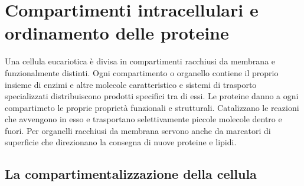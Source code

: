 \chapter{Compartimenti intracellulari e ordinamento delle proteine}
Una cellula eucariotica \`e divisa in compartimenti racchiusi da membrana e funzionalmente distinti. Ogni compartimento o organello contiene il proprio insieme di enzimi e altre molecole
caratteristico e sistemi di trasporto specializzati distribuiscono prodotti specifici tra di essi. Le proteine danno a ogni compartimeto le proprie propriet\`a funzionali e strutturali.
Catalizzano le reazioni che avvengono in esso e trasportano selettivamente piccole molecole dentro e fuori. Per organelli racchiusi da membrana servono anche da marcatori di superficie
che direzionano la consegna di nuove proteine e lipidi. 
\section{La compartimentalizzazione della cellula}

